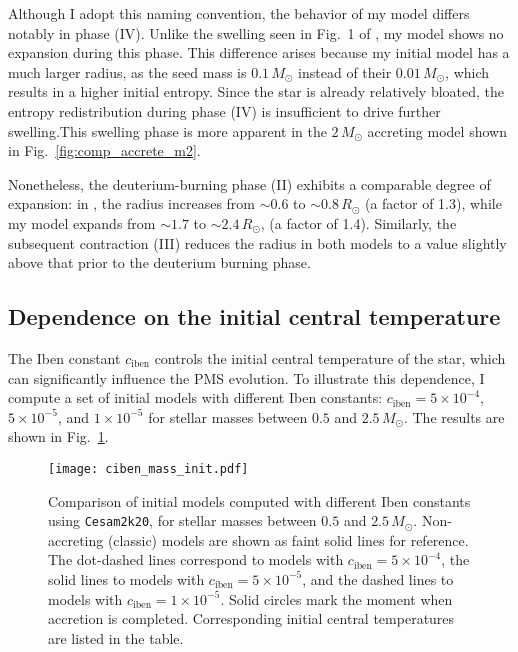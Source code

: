 \documentclass[12pt,a4paper]{article}
\newcommand{\mr}{\mathrm}
\begin{document}
Although I adopt this naming convention, the behavior of my model differs notably in phase (IV). Unlike the swelling seen in Fig.~1 of \textcite{KunitomoEtAl2017}, my model shows no expansion during this phase. This difference arises because my initial model has a much larger radius, as the seed mass is $0.1\,M_\odot$ instead of their $0.01\,M_\odot$, which results in a higher initial entropy. Since the star is already relatively bloated, the entropy redistribution during phase (IV) is insufficient to drive further swelling.This swelling phase is more apparent in the $2\,M_\odot$ accreting model shown in Fig.~\ref{fig:comp_accrete_m2}.

Nonetheless, the deuterium-burning phase (II) exhibits a comparable degree of expansion: in \textcite{KunitomoEtAl2017}, the radius increases from $\sim 0.6$ to $\sim 0.8\,R_\odot$ (a factor of 1.3), while my model expands from $\sim 1.7$ to $\sim 2.4\,R_\odot$, (a factor of 1.4). Similarly, the subsequent contraction (III) reduces the radius in both models to a value slightly above that prior to the deuterium burning phase.

\subsection{Dependence on the initial central temperature}
\label{sec:initial_models}

The Iben constant $c_\mr{iben}$ controls the initial central temperature of the star, which can significantly influence the PMS evolution. To illustrate this dependence, I compute a set of initial models with different Iben constants: $c_\mr{iben} = 5 \times 10^{-4}$, $5 \times 10^{-5}$, and $1 \times 10^{-5}$ for stellar masses between $0.5$ and $2.5\,M_\odot$. The results are shown in Fig.~\ref{fig:comp_iben}.

\begin{figure}[htbp]
  \centering
  \texttt{[image: ciben\_mass\_init.pdf]}
  \caption{Comparison of initial models computed with different Iben constants using \texttt{Cesam2k20}, for stellar masses between $0.5$ and $2.5\,M_\odot$. Non-accreting (classic) models are shown as faint solid lines for reference. The dot-dashed lines correspond to models with $c_\mr{iben} = 5\times10^{-4}$, the solid lines to models with $c_\mr{iben} = 5\times10^{-5}$, and the dashed lines to models with $c_\mr{iben} = 1\times10^{-5}$. Solid circles mark the moment when accretion is completed. Corresponding initial central temperatures are listed in the table.} 
  \label{fig:comp_iben}
\end{figure}
\end{document}
